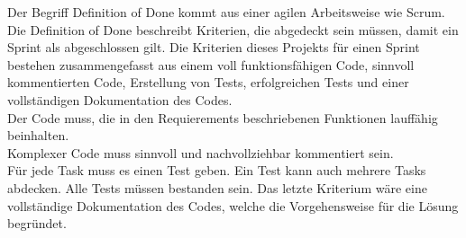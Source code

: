 Der Begriff Definition of Done kommt aus einer agilen Arbeitsweise wie Scrum.\\
Die Definition of Done beschreibt Kriterien, die abgedeckt sein müssen, damit ein Sprint als abgeschlossen gilt.
Die Kriterien dieses Projekts für einen Sprint bestehen zusammengefasst aus einem voll funktionsfähigen Code, sinnvoll kommentierten Code, Erstellung von Tests, erfolgreichen Tests und einer vollständigen Dokumentation des Codes.\\
Der Code muss, die in den Requierements beschriebenen Funktionen lauffähig beinhalten.\\
Komplexer Code muss sinnvoll und nachvollziehbar kommentiert sein.\\
Für jede Task muss es einen Test geben. Ein Test kann auch mehrere Tasks abdecken. Alle Tests müssen bestanden sein.
Das letzte Kriterium wäre eine vollständige Dokumentation des Codes, welche die Vorgehensweise für die Lösung begründet.